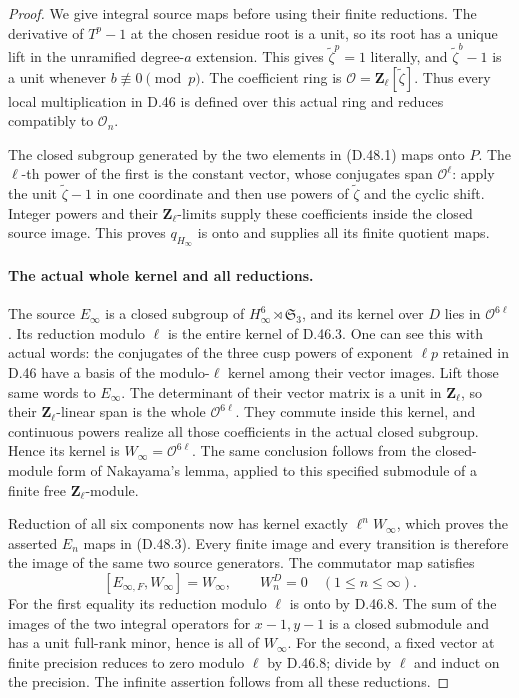 \begin{proof}
We give integral source maps before using their finite reductions.
The derivative of \(T^p-1\) at the chosen residue
root is a unit, so its root has a unique lift in the
unramified degree-\(a\) extension. This gives
\(\widetilde\zeta^p=1\) literally, and
\(\widetilde\zeta^b-1\) is a unit whenever
\(b\not\equiv0\pmod p\).
The coefficient ring is
\(\mathcal O=\mathbf Z_\ell[\widetilde\zeta]\).
Thus every local multiplication in D.46 is defined
over this actual ring and reduces compatibly to
\(\mathcal O_n\).

The closed subgroup generated by the two elements
in \textup{(D.48.1)} maps onto \(P\).
The \(\ell\)-th power of the first is the
constant vector, whose conjugates span
\(\mathcal O^\ell\): apply the unit
\(\widetilde\zeta-1\) in one coordinate and
then use powers of \(\widetilde\zeta\) and
the cyclic shift. Integer powers and their
\(\mathbf Z_\ell\)-limits supply these coefficients
inside the closed source image. This proves
\(q_{H_\infty}\) is onto and supplies all its
finite quotient maps.

\paragraph{The actual whole kernel and all reductions.}
The source \(E_\infty\) is a closed subgroup of
\(H_\infty^6\rtimes\mathfrak S_3\), and its
kernel over \(D\) lies in \(\mathcal O^{6\ell}\).
Its reduction modulo \(\ell\) is the entire
kernel of D.46.3. One can see this with actual words:
the conjugates of the three cusp powers of exponent
\(\ell p\) retained in D.46 have a basis of the
modulo-\(\ell\) kernel among their vector images.
Lift those same words to \(E_\infty\).
The determinant of their vector matrix is a unit
in \(\mathbf Z_\ell\), so their
\(\mathbf Z_\ell\)-linear span is the whole
\(\mathcal O^{6\ell}\).
They commute inside this kernel, and continuous
powers realize all those coefficients in the
actual closed subgroup. Hence its kernel is
\(W_\infty=\mathcal O^{6\ell}\).
The same conclusion follows from the closed-module
form of Nakayama's lemma, applied to this specified
submodule of a finite free \(\mathbf Z_\ell\)-module.

Reduction of all six components now has kernel
exactly \(\ell^n W_\infty\), which proves
the asserted \(E_n\) maps in
\textup{(D.48.3)}. Every finite image and
every transition is therefore the image of the
same two source generators.
The commutator map satisfies
\[
 [E_{\infty,F},W_\infty]=W_\infty,
 \qquad W_n^D=0\quad(1\leq n\leq\infty).
 \tag{D.48.6}
\]
For the first equality its reduction modulo
\(\ell\) is onto by D.46.8. The sum of the
images of the two integral operators for
\(x-1,y-1\) is a closed submodule and has
a unit full-rank minor, hence is all of
\(W_\infty\). For the second, a fixed vector
at finite precision reduces to zero modulo
\(\ell\) by D.46.8; divide by \(\ell\)
and induct on the precision. The infinite
assertion follows from all these reductions.


\end{proof}
